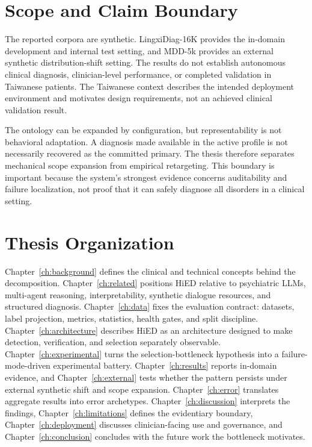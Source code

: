 \section{Scope and Claim Boundary}

The reported corpora are synthetic. LingxiDiag-16K provides the in-domain development and internal test setting, and MDD-5k provides an external synthetic distribution-shift setting. The results do not establish autonomous clinical diagnosis, clinician-level performance, or completed validation in Taiwanese patients. The Taiwanese context describes the intended deployment environment and motivates design requirements, not an achieved clinical validation result.

The ontology can be expanded by configuration, but representability is not behavioral adaptation. A diagnosis made available in the active profile is not necessarily recovered as the committed primary. The thesis therefore separates mechanical scope expansion from empirical retargeting. This boundary is important because the system's strongest evidence concerns auditability and failure localization, not proof that it can safely diagnose all disorders in a clinical setting.

\section{Thesis Organization}

Chapter~\ref{ch:background} defines the clinical and technical concepts behind the decomposition. Chapter~\ref{ch:related} positions HiED relative to psychiatric LLMs, multi-agent reasoning, interpretability, synthetic dialogue resources, and structured diagnosis. Chapter~\ref{ch:data} fixes the evaluation contract: datasets, label projection, metrics, statistics, health gates, and split discipline. Chapter~\ref{ch:architecture} describes HiED as an architecture designed to make detection, verification, and selection separately observable. Chapter~\ref{ch:experimental} turns the selection-bottleneck hypothesis into a failure-mode-driven experimental battery. Chapter~\ref{ch:results} reports in-domain evidence, and Chapter~\ref{ch:external} tests whether the pattern persists under external synthetic shift and scope expansion. Chapter~\ref{ch:error} translates aggregate results into error archetypes. Chapter~\ref{ch:discussion} interprets the findings, Chapter~\ref{ch:limitations} defines the evidentiary boundary, Chapter~\ref{ch:deployment} discusses clinician-facing use and governance, and Chapter~\ref{ch:conclusion} concludes with the future work the bottleneck motivates.
